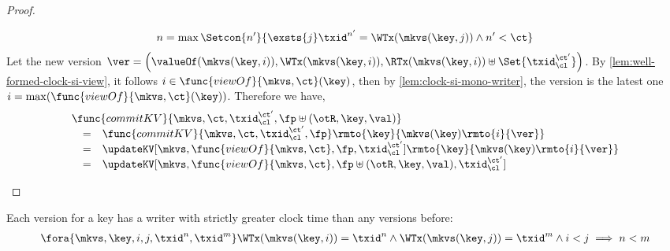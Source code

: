 \begin{proof}
\begin{itemize}
            \[
                n = \max\Setcon{n'}{%
                    \exsts{j} 
                    \txid^{n'} = \WTx(\mkvs(\key, j)) 
                    \land n' < \ct%
                } 
            \]
            Let the new version \( \ver = \left( \valueOf(\mkvs(\key,i)), \WTx(\mkvs(\key,i)), \RTx(\mkvs(\key,i)) \uplus \Set{\txid_\cl^{\ct'}} \right) \).
            By \cref{lem:well-formed-clock-si-view}, it follows \( i \in \func{viewOf}{\mkvs,\ct}(\key) \), then by \cref{lem:clock-si-mono-writer}, the version is the latest one \( i = \max(\func{viewOf}{\mkvs,\ct}(\key)) \).
            Therefore we have,
            \[
                \begin{array}{@{}l@{}}
                \func{commitKV}{\mkvs,\ct,\txid_\cl^{\ct'},\fp \uplus (\otR, \key, \val)}  \\
                \quad \begin{array}[t]{@{}c l@{}}
                = &
                \func{commitKV}{\mkvs,\ct,\txid_\cl^{\ct'},\fp}\rmto{\key}{\mkvs(\key)\rmto{i}{\ver}} \\
                = & 
                \updateKV[\mkvs,\func{viewOf}{\mkvs,\ct},\fp,\txid_\cl^{\ct'}]\rmto{\key}{\mkvs(\key)\rmto{i}{\ver}} \\
                = & 
                \updateKV[\mkvs,\func{viewOf}{\mkvs,\ct},\fp \uplus (\otR, \key, \val),\txid_\cl^{\ct'}]
                \end{array}
                \end{array}
            \]
    \end{itemize}
\end{proof}

\begin{lemma}
    \label{lem:clock-si-mono-writer}
    Each version for a key has a writer with strictly greater clock time than any versions before:
    \[
        \begin{array}{@{}l@{}}
            \fora{\mkvs,\key,i,j,\txid^n,\txid^m} 
            \WTx(\mkvs(\key,i)) = \txid^n 
            \land \WTx(\mkvs(\key,j)) = \txid^m 
            \land i < j
            \implies 
            n < m
        \end{array}
    \]
\end{lemma}

